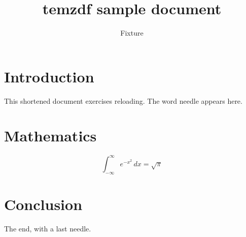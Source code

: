 \documentclass[11pt]{article}
\title{temzdf sample document}
\author{Fixture}
\date{}
\begin{document}
\maketitle
\tableofcontents
\section{Introduction}\label{sec:intro}
This shortened document exercises reloading. The word needle appears here.
\section{Mathematics}\label{sec:math}
\begin{equation}\label{eq:gauss}
  \int_{-\infty}^{\infty} e^{-x^2}\,dx = \sqrt{\pi}
\end{equation}
\newpage
\section{Conclusion}\label{sec:conclusion}
The end, with a last needle.
\end{document}
